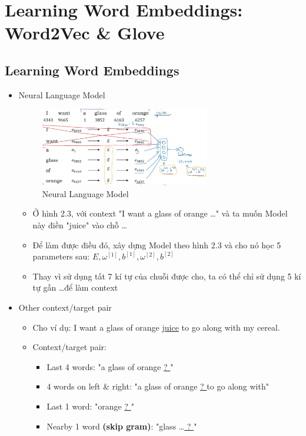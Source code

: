 \documentclass[12pt,a4paper]{report}
\begin{document}
	\section{Learning Word Embeddings: Word2Vec \& Glove}
		\subsection{Learning Word Embeddings}
			\begin{itemize}
			\item Neural Language Model
				\begin{figure}
					\caption{Neural Language Model}
					\centering
					\includegraphics[width=0.7\textwidth]{4}
				\end{figure}
				\begin{itemize}
				\item Ở hình 2.3, với context "I want a glass of orange \dots" và ta muốn Model này điền "juice" vào chỗ \dots
				\item Để làm được điều đó, xây dựng Model theo hình 2.3 và cho nó học 5 parameters sau: $E, \omega^{[1]}, b^{[1]}, \omega^{[2]}, b^{[2]}$
				\item Thay vì sử dụng tất 7 kí tự của chuỗi được cho, ta có thể chỉ sử dụng 5 kí tự gần \dots để làm context
				\end{itemize}
			\item Other context/target pair
				\begin{itemize}
				\item Cho ví dụ: I want a glass of orange  \underline{juice} to go along with my cereal.
				\item Context/target pair:
					\begin{itemize}
					\item Last 4 words: "a glass of orange \underline{   ?   }"
					\item 4 words on left \& right: "a glass of orange \underline{   ?   } to go along with"
					\item Last 1 word: "orange \underline{   ?   }"
					\item Nearby 1 word \textbf{(skip gram)}: "glass \dots \underline{   ?   }"	
					\end{itemize}
				\end{itemize}
			\end{itemize}
\end{document}
